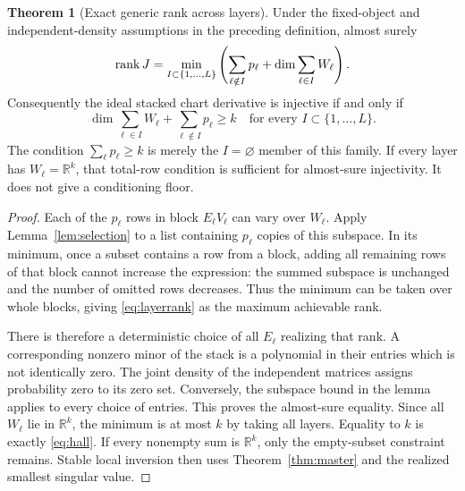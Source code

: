 \documentclass[11pt,a4paper]{article}
\theoremstyle{definition}
\newtheorem{theorem}{Theorem}[section]
\theoremstyle{definition}
\theoremstyle{remark}\newtheorem{remark}[theorem]{Remark}
\newcommand{\R}{\mathbb R}\newcommand{\Prob}{\mathbb P}\newcommand{\E}{\mathbb E}
\begin{document}
\begin{theorem}[Exact generic rank across layers]\label{thm:layerrank}
Under the fixed-object and independent-density assumptions in the preceding definition, almost surely
\begin{equation}\label{eq:layerrank}
\operatorname{rank} J=
\min_{I\subset\{1,\ldots,L\}}\left(
\sum_{\ell\notin I}p_\ell+\dim\sum_{\ell\in I}W_\ell
\right).
\end{equation}
Consequently the ideal stacked chart derivative is injective if and only if
\begin{equation}\label{eq:hall}
\dim\sum_{\ell\in I}W_\ell+\sum_{\ell\notin I}p_\ell\ge k
\quad\text{for every }I\subset\{1,\ldots,L\}.
\end{equation}
The condition $\sum_\ell p_\ell\ge k$ is merely the $I=\varnothing$ member of this family. If every layer has $W_\ell=\R^k$, that total-row condition is sufficient for almost-sure injectivity. It does not give a conditioning floor.
\end{theorem}
\begin{proof}
Each of the $p_\ell$ rows in block $E_\ell V_\ell$ can vary over $W_\ell$. Apply Lemma~\ref{lem:selection} to a list containing $p_\ell$ copies of this subspace. In its minimum, once a subset contains a row from a block, adding all remaining rows of that block cannot increase the expression: the summed subspace is unchanged and the number of omitted rows decreases. Thus the minimum can be taken over whole blocks, giving \eqref{eq:layerrank} as the maximum achievable rank.

There is therefore a deterministic choice of all $E_\ell$ realizing that rank. A corresponding nonzero minor of the stack is a polynomial in their entries which is not identically zero. The joint density of the independent matrices assigns probability zero to its zero set. Conversely, the subspace bound in the lemma applies to every choice of entries. This proves the almost-sure equality. Since all $W_\ell$ lie in $\R^k$, the minimum is at most $k$ by taking all layers. Equality to $k$ is exactly \eqref{eq:hall}. If every nonempty sum is $\R^k$, only the empty-subset constraint remains. Stable local inversion then uses Theorem~\ref{thm:master} and the realized smallest singular value.
\end{proof}
\end{document}
